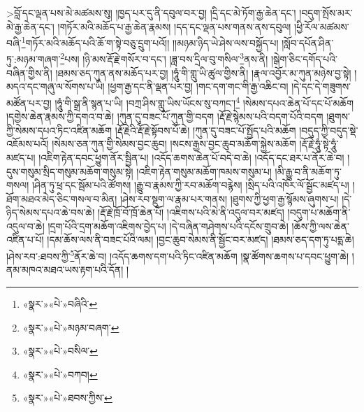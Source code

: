 >བློ་དང་ལྡན་པས་མེ་མཚམས་སུ། །ཁྱད་པར་དུ་ནི་དབུལ་བར་བྱ། །དྲི་དང་མེ་ཏོག་རྒྱ་ཆེན་དང་། །བདུག་སྤོས་མར་མེ་རྒྱ་ཆེན་དང་། །གཏོར་མའི་མཆོད་པ་རྒྱ་ཆེན་རྣམས། །དད་དང་ལྡན་པས་གནས་ནས་དབུལ། །ཕྱི་རོལ་མཚམས་བཞི་\footnote{«སྣར་»«པེ་»བཞིའི་}གཏོར་མའི་མཆོད་པའི་ཆོ་ག་སྟེ་བཅུ་དྲུག་པའོ།། །།མཉམ་ཉིད་ཡེ་ཤེས་ལས་བསྐྱོད་པ། །སློབ་དཔོན་ཤིན་ཏུ་:མཉམ་གཞག་\footnote{«སྣར་»«པེ་»མཉམ་བཞག་}པས། །ཉི་མས་རྡོ་རྗེ་གསོར་བ་དང་། །ཟླ་བས་དྲིལ་བུ་གསིལ་\footnote{«སྣར་»«པེ་»བསིལ་}ནས་ནི། །སྒེག་ཅིང་དགོད་པའི་བཞིན་གྱིས་ནི། །ཐམས་ཅད་ཀུན་ནས་མཆོད་པར་བྱ། །ཧཱུཾ་གི་གླུ་ཡི་ཚུལ་གྱིས་ནི། །རྣལ་འབྱོར་མ་ཀུན་མཉེས་བྱ་སྟེ། །མདའ་དང་གཞུ་ལ་སོགས་པ་ཡི། །ཕྱག་རྒྱ་དང་ནི་ལྡན་པར་བྱ། །གང་དག་གང་གི་རྒྱ་འཆིང་བ། །དེ་དང་དེ་གཟུགས་མཚོན་པར་བྱ། །ཧཱུཾ་གི་སྒྲ་ནི་སྙན་པ་ཡི། །བཀྲ་ཤིས་གླུ་ཡིས་ཡོངས་སུ་བཀང་།\footnote{«སྣར་»«པེ་»བཀབ།} །སེམས་དཔའ་ཆེན་པོ་དང་པོ་མཆོག །དགྱེས་ཆེན་རྣམས་ཀྱི་དགའ་བ་ཆེ། །ཀུན་དུ་བཟང་པོ་ཀུན་གྱི་བདག །རྡོ་རྗེ་སྙེམས་པའི་བདག་པོའི་བདག །ཐུགས་ཀྱི་སེམས་དཔའ་ཏིང་འཛིན་མཆོག །རྡོ་རྗེའི་རྡོ་རྗེ་སྟོབས་པོ་ཆེ། །ཀུན་དུ་བཟང་པོ་སྤྱོད་པའི་མཆོག །བདུད་ཀྱི་བདུད་སྡེ་འཇོམས་པའོ། །སེམས་ཅན་ཀུན་གྱི་སེམས་བྱང་ཆུབ། །སངས་རྒྱས་བྱང་ཆུབ་མཆོག་སྐྱེས་མཆོག །རྡོ་རྗེ་ཧཱུཾ་སྟེ་ཧཱུཾ་མཛད་པ། །འཇིག་རྟེན་དབང་ཕྱུག་ནོར་སྦྱིན་པ། །འདོད་ཆགས་ཆེན་པོ་བདེ་བ་ཆེ། །འདོད་དང་ཐར་པ་ནོར་ཆེ་བ། །དུས་གསུམ་སྲིད་གསུམ་མཆོག་གསུམ་སྟེ། །འཇིག་རྟེན་གསུམ་མཆོག་ཁམས་གསུམ་པ། །མི་རྒྱུ་བ་ནི་མཆོག་ཏུ་གསལ། །ཤིན་ཏུ་ཕྲ་དང་སྦོམ་པའི་ཚོགས། །རྒྱུ་བ་རྣམས་ཀྱི་རབ་མཆོག་བརྙེས། །སྲིད་པའི་འཁོར་ལོ་སྦྱོང་མཛད་པ། །ཐོག་མཐའ་མེད་ཅིང་གསལ་བ་མིན། །ཤེས་རབ་སྡུག་ལ་རྣམ་པར་གནས། །ཐུགས་ཀྱི་ཕྱག་རྒྱ་སྙོམས་ཞུགས་པ། །དེ་ཉིད་སེམས་དཔའ་ཆེ་བས་ཆེ། །རྡོ་རྗེ་ཁྲོ་བོ་ཁྲོ་ཆེན་པོ། །འཇིགས་པའི་མེ་ནི་འདུལ་བར་མཛད། །བདུག་པ་མཆོག་ནི་འདུལ་བ་ཆེ། །དྲག་པོའི་དྲག་མཆོག་འཇིགས་བྱེད་པ། །དེ་བཞིན་གཤེགས་པའི་དངོས་གྲུབ་ཆེ། །ཆོས་ཀྱི་ལས་ཆེན་འཛིན་པ་པོ། །དམ་ཆོས་ལས་ནི་བཟང་པོའི་ལམ། །བྱང་ཆུབ་སེམས་ནི་སྦྱོང་བར་མཛད། །ཐམས་ཅད་དག་ཏུ་པདྨ་ཆེ། །ཤེས་རབ་:ཐབས་ཀྱི་\footnote{«སྣར་»«པེ་»ཐབས་ཀྱིས་}ནོར་ཆེ་བ། །འདོད་ཆགས་དག་པའི་ཏིང་འཛིན་མཆོག །སྣ་ཚོགས་ཆགས་པ་དབང་ཕྱུག་ཆེ། །ནམ་མཁའ་མཐའ་ཡས་རྟག་པའི་དོན། །
